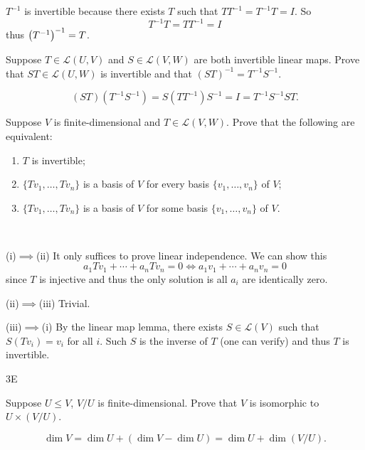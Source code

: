 \begin{solution}
$T^{-1}$ is invertible because there exists $T$ such that $TT^{-1}=T^{-1}T=I$. So
\[T^{-1}T=TT^{-1}=I\]
thus $\left(T^{-1}\right)^{-1}=T$.
\end{solution}

\begin{prbm}
Suppose $T\in\mathcal{L}(U,V)$ and $S\in\mathcal{L}(V,W)$ are both invertible linear maps. Prove that $ST\in\mathcal{L}(U,W)$ is invertible and that $(ST)^{-1}=T^{-1}S^{-1}$.
\end{prbm}

\begin{solution}
\[(ST)(T^{-1}S^{-1})=S(TT^{-1})S^{-1}=I=T^{-1}S^{-1}ST.\]
\end{solution}

\begin{prbm}
Suppose $V$ is finite-dimensional and $T\in\mathcal{L}(V,W)$. Prove that the following are equivalent:
\begin{enumerate}[label=(\roman*)]
\item $T$ is invertible;
\item $\{Tv_1,\dots,Tv_n\}$ is a basis of $V$ for every basis $\{v_1,\dots,v_n\}$ of $V$;
\item $\{Tv_1,\dots,Tv_n\}$ is a basis of $V$ for some basis $\{v_1,\dots,v_n\}$ of $V$.
\end{enumerate}
\end{prbm}

\begin{solution} \

(i)$\implies$(ii) It only suffices to prove linear independence. We can show this
\[a_1Tv_1+\cdots+a_nTv_n=0\iff a_1v_1+\cdots+a_nv_n=0\]
since $T$ is injective and thus the only solution is all $a_i$ are identically zero.

(ii)$\implies$(iii) Trivial.

(iii)$\implies$(i) By the linear map lemma, there exists $S\in\mathcal{L}(V)$ such that $S(Tv_i)=v_i$ for all $i$. Such $S$ is the inverse of $T$ (one can verify) and thus $T$ is invertible.
\end{solution}

3E
\begin{prbm}
Suppose $U\le V$, $V/U$ is finite-dimensional. Prove that $V$ is isomorphic to $U\times(V/U)$.
\end{prbm}

\begin{solution}
\[\dim V=\dim U+(\dim V-\dim U)=\dim U+\dim(V/U).\]
\end{solution}